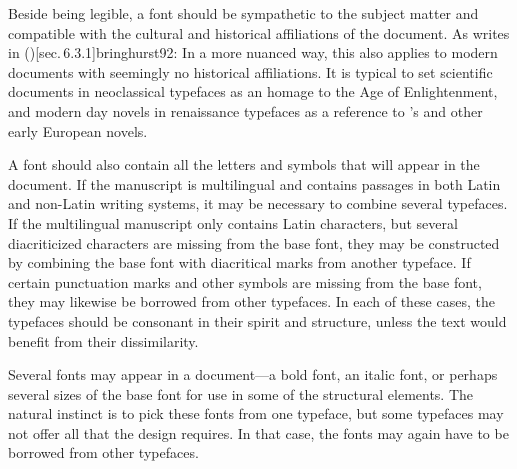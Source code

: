 \documentclass[
  a5paper,10pt,           %
  dvipsnames              %
]{book}
\begin{document}
Beside being legible, a font should be sympathetic to the subject matter and
compatible with the cultural and historical affiliations of the document. As
 writes in \citework*()[sec.\,6.3.1]{bringhurst92}:
 In a more nuanced way, this also applies to modern
documents with seemingly no historical affiliations. It is typical to set
scientific documents in neoclassical typefaces as an homage to the Age of
Enlightenment, and modern day novels in renaissance typefaces as a reference to
's  and other early
European novels.

A font should also contain all the letters and symbols that will appear in
the document. If the manuscript is multilingual and contains passages in both
Latin and non-Latin writing systems, it may be necessary to combine several
typefaces. If the multilingual manuscript only contains Latin characters, but
several diacriticized characters are missing from the base font, they may be
constructed by combining the base font with diacritical marks from another
typeface. If certain punctuation marks and other symbols are missing from the
base font, they may likewise be borrowed from other typefaces. In each of these
cases, the typefaces should be consonant in their spirit and structure, unless
the text would benefit from their dissimilarity.

Several fonts may appear in a document---a bold font, an italic font, or perhaps
several sizes of the base font for use in some of the structural elements. The
natural instinct is to pick these fonts from one typeface, but some typefaces
may not offer all that the design requires. In that case, the fonts may again
have to be borrowed from other typefaces.

\end{document}
